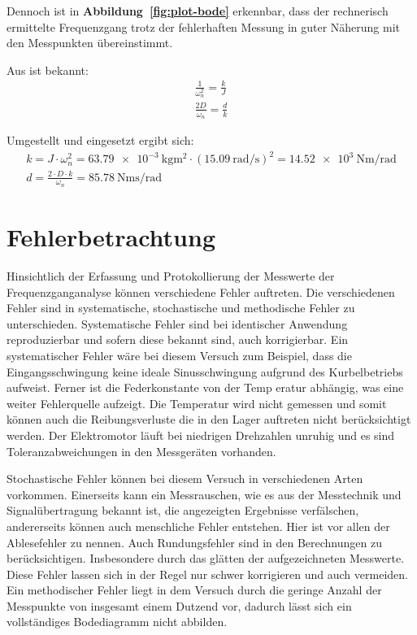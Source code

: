 \documentclass[a4paper,12pt]{scrartcl}
\begin{document}
Dennoch ist in \textbf{Abbildung~\ref{fig:plot-bode}} erkennbar, dass der rechnerisch ermittelte Frequenzgang trotz der fehlerhaften Messung in guter Näherung mit den Messpunkten übereinstimmt.

Aus \cite{skript} ist bekannt:
\begin{gather}
	\frac{1}{\omega_{n}^{2}} = \frac{k}{J} \\
	\frac{2 D}{\omega_{n}} = \frac{d}{k}
\end{gather}

Umgestellt und eingesetzt ergibt sich:%
\begin{gather}
	k = J \cdot \omega_{n}^{2} = \SI{63.79e-3}{\kilogram\square\metre} \cdot \left( \SI{15.09}{\radian\per\second} \right)^{2} = \SI{14.52e3}{\newton\metre\per\radian}\\
	d = \frac{2 \cdot D \cdot k}{\omega_{n}} = \SI{85.78}{\newton\metre\second\per\radian}
\end{gather}

\section{Fehlerbetrachtung}
Hinsichtlich der Erfassung und Protokollierung der Messwerte der
Frequenzganganalyse können verschiedene Fehler auftreten. Die verschiedenen Fehler
sind in systematische, stochastische und methodische Fehler zu unterschieden.
Systematische Fehler sind bei identischer Anwendung reproduzierbar und sofern diese
bekannt sind, auch korrigierbar. Ein systematischer Fehler wäre bei diesem Versuch
zum Beispiel, dass die Eingangsschwingung keine ideale Sinusschwingung aufgrund
des Kurbelbetriebs aufweist. Ferner ist die Federkonstante von der Temp eratur
abhängig, was eine weiter Fehlerquelle aufzeigt. Die Temperatur wird nicht gemessen
und somit können auch die Reibungsverluste die in den Lager auftreten nicht
berücksichtigt werden. Der Elektromotor läuft bei niedrigen Drehzahlen unruhig und
es sind Toleranzabweichungen in den Messgeräten vorhanden.

Stochastische Fehler
können bei diesem Versuch in verschiedenen Arten vorkommen. Einerseits kann ein
Messrauschen, wie es aus der Messtechnik und Signalübertragung bekannt ist, die
angezeigten Ergebnisse verfälschen, andererseits können auch menschliche Fehler
entstehen. Hier ist vor allen der Ablesefehler zu nennen. Auch Rundungsfehler sind
in den Berechnungen zu berücksichtigen. Insbesondere durch das glätten der
aufgezeichneten Messwerte. Diese Fehler lassen sich in der Regel nur schwer
korrigieren und auch vermeiden. Ein methodischer Fehler liegt in dem Versuch durch
die geringe Anzahl der Messpunkte von insgesamt einem Dutzend vor, dadurch lässt sich
ein vollständiges Bodediagramm nicht abbilden.
\end{document}
